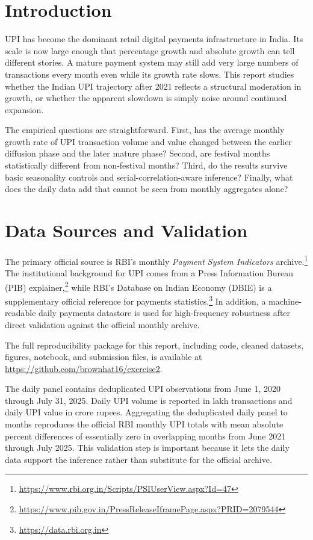 \documentclass[11pt]{article}
\begin{document}
\section{Introduction}

UPI has become the dominant retail digital payments infrastructure in India. Its scale is now large enough that percentage growth and absolute growth can tell different stories. A mature payment system may still add very large numbers of transactions every month even while its growth rate slows. This report studies whether the Indian UPI trajectory after 2021 reflects a structural moderation in growth, or whether the apparent slowdown is simply noise around continued expansion.

The empirical questions are straightforward. First, has the average monthly growth rate of UPI transaction volume and value changed between the earlier diffusion phase and the later mature phase? Second, are festival months statistically different from non-festival months? Third, do the results survive basic seasonality controls and serial-correlation-aware inference? Finally, what does the daily data add that cannot be seen from monthly aggregates alone?

\section{Data Sources and Validation}

The primary official source is RBI's monthly \emph{Payment System Indicators} archive.\footnote{\url{https://www.rbi.org.in/Scripts/PSIUserView.aspx?Id=47}} The institutional background for UPI comes from a Press Information Bureau (PIB) explainer,\footnote{\url{https://www.pib.gov.in/PressReleaseIframePage.aspx?PRID=2079544}} while RBI's Database on Indian Economy (DBIE) is a supplementary official reference for payments statistics.\footnote{\url{https://data.rbi.org.in}} In addition, a machine-readable daily payments datastore is used for high-frequency robustness after direct validation against the official monthly archive.

The full reproducibility package for this report, including code, cleaned datasets, figures, notebook, and submission files, is available at \url{https://github.com/brownhat16/exercise2}.

The daily panel contains deduplicated UPI observations from June 1, 2020 through July 31, 2025. Daily UPI volume is reported in lakh transactions and daily UPI value in crore rupees. Aggregating the deduplicated daily panel to months reproduces the official RBI monthly UPI totals with mean absolute percent differences of essentially zero in overlapping months from June 2021 through July 2025. This validation step is important because it lets the daily data support the inference rather than substitute for the official archive.
\end{document}
